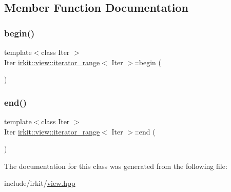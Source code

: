 \subsection{Member Function Documentation}
\mbox{\label{classirkit_1_1view_1_1iterator__range_a510f0a679cad2562b8537fafef71cf5e}} 
\subsubsection{\texorpdfstring{begin()}{begin()}}
{\footnotesize\ttfamily template$<$class Iter $>$ \\
Iter \hyperlink{classirkit_1_1view_1_1iterator__range}{irkit\+::view\+::iterator\+\_\+range}$<$ Iter $>$\+::begin (\begin{DoxyParamCaption}{ }\end{DoxyParamCaption})\hspace{0.3cm}{\ttfamily [inline]}}

\mbox{\label{classirkit_1_1view_1_1iterator__range_ae3f8255c281477d615a56b81c736cdae}} 
\subsubsection{\texorpdfstring{end()}{end()}}
{\footnotesize\ttfamily template$<$class Iter $>$ \\
Iter \hyperlink{classirkit_1_1view_1_1iterator__range}{irkit\+::view\+::iterator\+\_\+range}$<$ Iter $>$\+::end (\begin{DoxyParamCaption}{ }\end{DoxyParamCaption})\hspace{0.3cm}{\ttfamily [inline]}}



The documentation for this class was generated from the following file\+:\begin{DoxyCompactItemize}
\item 
include/irkit/\hyperlink{view_8hpp}{view.\+hpp}\end{DoxyCompactItemize}

